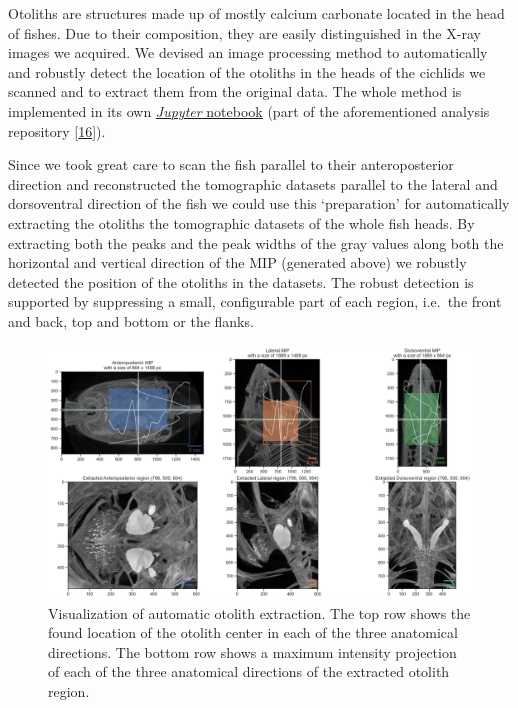 Otoliths are structures made up of mostly calcium carbonate located in the head of fishes.
Due to their composition, they are easily distinguished in the X-ray images we acquired.
We devised an image processing method to automatically and robustly detect the location of the otoliths in the heads of the cichlids we scanned and to extract them from the original data.
The whole method is implemented in its own \href{https://github.com/habi/EAWAG/blob/master/ExtractOtoliths.ipynb}{\emph{Jupyter} notebook} (part of the aforementioned analysis repository {[}\protect\hyperlink{ref-1HteOscVd}{16}{]}).

Since we took great care to scan the fish parallel to their anteroposterior direction and reconstructed the tomographic datasets parallel to the lateral and dorsoventral direction of the fish we could use this `preparation' for automatically extracting the otoliths the tomographic datasets of the whole fish heads.
By extracting both the peaks and the peak widths of the gray values along both the horizontal and vertical direction of the MIP (generated above) we robustly detected the position of the otoliths in the datasets.
The robust detection is supported by suppressing a small, configurable part of each region, i.e.~the front and back, top and bottom or the flanks.

\begin{figure}
\hypertarget{fig:otolithextraction}{%
\centering
\includegraphics{images/104016.head.rec.otolither.position.png}
\caption{Visualization of automatic otolith extraction.
The top row shows the found location of the otolith center in each of the three anatomical directions.
The bottom row shows a maximum intensity projection of each of the three anatomical directions of the extracted otolith region.}\label{fig:otolithextraction}
}
\end{figure}

